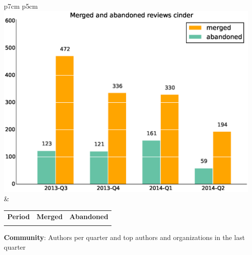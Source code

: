 \documentclass[a4wide,11pt]{report}
\begin{document}
\begin{tabular}{p{7cm} p{5cm}}
    \vspace{0pt} 
    \includegraphics[scale=.35]{figs/submitted_reviewscinder.eps}
    & 
    \vspace{0pt}
    \begin{tabular}{l|r|r|}%
    \bfseries Period & \bfseries Merged & \bfseries Abandoned %
    \csvreader[head to column names]{data/submitted_reviewscinder.csv}{}%
    {\\ & \merged & \abandoned}
    \end{tabular}
\end{tabular}


\textbf{Community}: Authors per quarter and top authors and organizations in the last quarter
\end{document}
